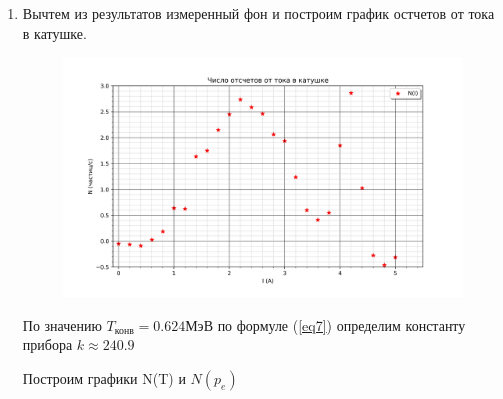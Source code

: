 \documentclass[a4paper]{article}
\begin{document}
\begin{enumerate}
    \item Вычтем из результатов измеренный фон и построим график остчетов от тока в катушке.
    \begin{figure}[H]
        \begin{center}
        \includegraphics[scale = 0.54]{N(I).png}
        \caption{}
        \label{g1}
        \end{center}
    \end{figure}

    По значению $T_{\text{конв}} = 0.624$МэВ по формуле (\ref{eq7}) определим константу прибора
    $k \approx 240.9$

    Построим графики N(T) и $N(p_e)$


\end{enumerate}
\end{document}
